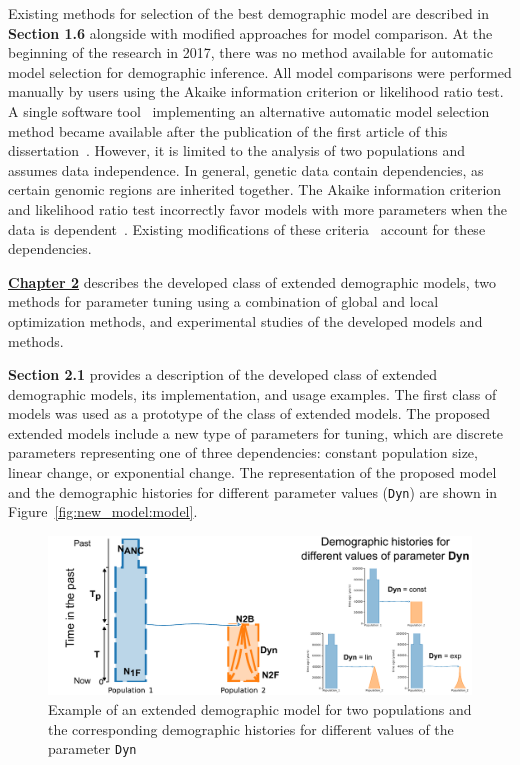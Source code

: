 Existing methods for selection of the best demographic model are described in \textbf{Section 1.6} alongside with modified approaches for model comparison.
At the beginning of the research in 2017, there was no method available for automatic model selection for demographic inference.
All model comparisons were performed manually by users using the Akaike information criterion or likelihood ratio test.
A single software tool~\cite{rippe2021environmental} implementing an alternative automatic model selection method became available after the publication of the first article of this dissertation~\cite{noskova2020gadma}.
However, it is limited to the analysis of two populations and assumes data independence.
In general, genetic data contain dependencies, as certain genomic regions are inherited together.
The Akaike information criterion and likelihood ratio test incorrectly favor models with more parameters when the data is dependent~\cite{gao2010composite}.
Existing modifications of these criteria~\cite{coffman2016computationally} account for these dependencies.

\underline{\textbf{Chapter 2}} describes the developed class of extended demographic models, two methods for parameter tuning using a combination of global and local optimization methods, and experimental studies of the developed models and methods.

\textbf{Section 2.1} provides a description of the developed class of extended demographic models, its implementation, and usage examples.
The first class of models was used as a prototype of the class of extended models.
The proposed extended models include a new type of parameters for tuning, which are discrete parameters representing one of three dependencies: constant population size, linear change, or exponential change.
The representation of the proposed model and the demographic histories for different parameter values (\texttt{Dyn}) are shown in Figure~\ref{fig:new_model:model}.

\begin{figure}[ht]
\centering
\includegraphics[width=0.9\linewidth]{images_2/picture_2pops_model_3_en.pdf}
\caption{Example of an extended demographic model for two populations and the corresponding demographic histories for different values of the parameter \texttt{Dyn}}
\end{figure}

